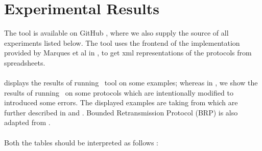 \section{Experimental Results}



The tool is available on GitHub \cite{github.MPass}, where we also
supply the source of all experiments listed below.
%
The tool uses the frontend of the implementation provided by Marques et al in 
\cite{CSV2UPPAAL}, to get {\sc xml} representations of the protocols from
spreadsheets.
\\\\
 displays the results of running \MPass\ tool on 
some examples;  whereas in , we show the 
results of running \MPass\ on some protocols which are intentionally modified to 
 introduced some errors. The displayed  examples are   taking  from \cite{JRSVgit} 
which are further described in \cite{MPSV11} and \cite{RSV11}.
Bounded Retransmission Protocol (BRP) is also adapted from \cite{AABJ04}.
\\\\
Both the tables should be interpreted as follows :

